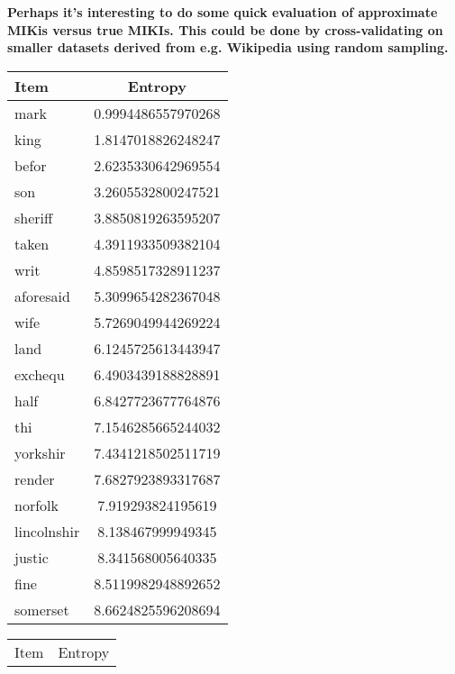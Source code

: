 \textbf{Perhaps it's interesting to do some quick evaluation of approximate MIKis versus true MIKIs. This could be done by cross-validating on smaller datasets derived from e.g. Wikipedia using random sampling.}

\begin{table}
    \begin{minipage}{.5\textwidth}
        \small
        \centering
    	\begin{tabular}{l S[round-precision=4]}
    		\toprule
    		{Item} & {Entropy}\\
    		\midrule
    		mark & 0.9994486557970268\\
    		king & 1.8147018826248247\\
    		befor & 2.6235330642969554\\
    		son & 3.2605532800247521\\
    		sheriff & 3.8850819263595207\\
    		taken & 4.3911933509382104\\
    		writ & 4.8598517328911237\\
    		aforesaid & 5.3099654282367048\\
    		wife & 5.7269049944269224\\
    		land & 6.1245725613443947\\
    		exchequ & 6.4903439188828891\\
    		half & 6.8427723677764876\\
    		thi & 7.1546285665244032\\
    		yorkshir & 7.4341218502511719\\
    		render & 7.6827923893317687\\
    		norfolk & 7.919293824195619\\
    		lincolnshir & 8.138467999949345\\
    		justic & 8.341568005640335\\
    		fine & 8.5119982948892652\\
    		somerset & 8.6624825596208694\\
    		\bottomrule
    	\end{tabular}
    	\label{t:miki_finerolls}
    \end{minipage}
    \begin{minipage}{.5\textwidth}
        \small
        \centering
    	\begin{tabular}{l S[round-precision=4]}
    		\toprule
    		{Item} & {Entropy}\\

\end{tabular}
\end{minipage}
\end{table}
